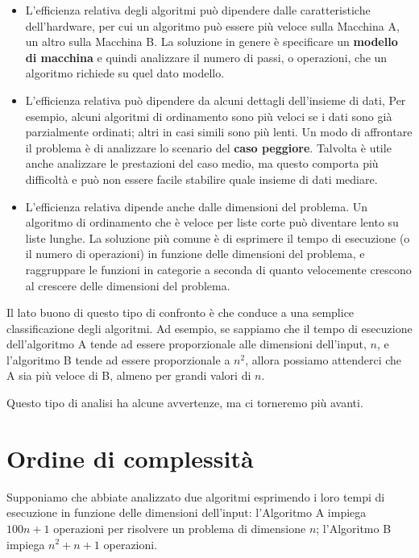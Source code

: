 \documentclass[10pt]{book}
\begin{document}
\begin{itemize}

\item L'efficienza relativa degli algoritmi può dipendere dalle caratteristiche dell'hardware, per cui un algoritmo può essere più veloce sulla Macchina A, un altro sulla Macchina B. La soluzione in genere è specificare un
{\bf modello di macchina} e quindi analizzare il numero di passi, o operazioni, che un algoritmo richiede su quel dato modello.

\item L'efficienza relativa può dipendere da alcuni dettagli dell'insieme di dati, Per esempio, alcuni algoritmi di ordinamento sono più veloci se i dati sono già parzialmente ordinati; altri in casi simili sono più lenti. Un modo di affrontare il problema è di analizzare lo scenario del {\bf caso peggiore}. Talvolta è utile anche analizzare le prestazioni del caso medio, ma questo comporta più difficoltà e può non essere facile stabilire quale insieme di dati mediare.

\item L'efficienza relativa dipende anche dalle dimensioni del problema. Un algoritmo di ordinamento che è veloce per liste corte può diventare lento su liste lunghe. La soluzione più comune è di esprimere il tempo di esecuzione (o il numero di operazioni) in funzione delle dimensioni del problema, e raggruppare le funzioni in categorie a seconda di quanto velocemente crescono al crescere delle dimensioni del problema.


\end{itemize}

Il lato buono di questo tipo di confronto è che conduce a una semplice classificazione degli algoritmi. Ad esempio, se sappiamo che il tempo di esecuzione dell'algoritmo A tende ad essere proporzionale alle dimensioni dell'input, $n$, e l'algoritmo B tende ad essere proporzionale a $n^2$, allora possiamo attenderci che A sia più veloce di B, almeno per grandi valori di $n$.

Questo tipo di analisi ha alcune avvertenze, ma ci torneremo più avanti.


\section{Ordine di complessità}

Supponiamo che abbiate analizzato due algoritmi esprimendo i loro tempi di esecuzione in funzione delle dimensioni dell'input: l'Algoritmo A impiega $100n+1$ operazioni per risolvere un problema di dimensione $n$; l'Algoritmo B impiega $n^2 + n + 1$ operazioni.
\end{document}
